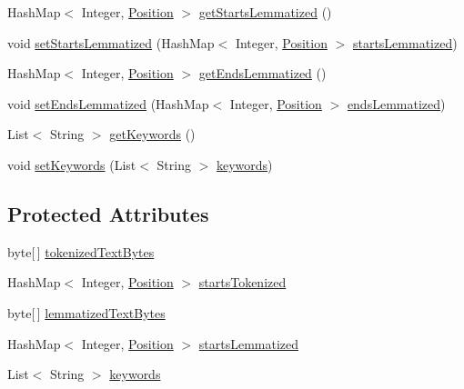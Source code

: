 \begin{DoxyCompactItemize}
\item 
Hash\+Map$<$ Integer, \hyperlink{classbr_1_1usp_1_1cata_1_1model_1_1_position}{Position} $>$ \hyperlink{classbr_1_1usp_1_1cata_1_1util_1_1_text_analyzer_language_a1e40bb475e2a0783236a3306ae2fc908}{get\+Starts\+Lemmatized} ()
\item 
void \hyperlink{classbr_1_1usp_1_1cata_1_1util_1_1_text_analyzer_language_af2cf60275059bfcea082e72e74bfffb6}{set\+Starts\+Lemmatized} (Hash\+Map$<$ Integer, \hyperlink{classbr_1_1usp_1_1cata_1_1model_1_1_position}{Position} $>$ \hyperlink{classbr_1_1usp_1_1cata_1_1util_1_1_text_analyzer_language_aff99f3709624a14b66386f13565c17c0}{starts\+Lemmatized})
\item 
Hash\+Map$<$ Integer, \hyperlink{classbr_1_1usp_1_1cata_1_1model_1_1_position}{Position} $>$ \hyperlink{classbr_1_1usp_1_1cata_1_1util_1_1_text_analyzer_language_a539448d1e72211b30c7d41db3037e6d6}{get\+Ends\+Lemmatized} ()
\item 
void \hyperlink{classbr_1_1usp_1_1cata_1_1util_1_1_text_analyzer_language_a1c021e7086708576a9a79eb8dcf0bc74}{set\+Ends\+Lemmatized} (Hash\+Map$<$ Integer, \hyperlink{classbr_1_1usp_1_1cata_1_1model_1_1_position}{Position} $>$ \hyperlink{classbr_1_1usp_1_1cata_1_1util_1_1_text_analyzer_language_ae4accddf4baccd7bd94f7182a06f7983}{ends\+Lemmatized})
\item 
List$<$ String $>$ \hyperlink{classbr_1_1usp_1_1cata_1_1util_1_1_text_analyzer_language_a671ff897c00c2497c5f2aa6a7bd74da9}{get\+Keywords} ()
\item 
void \hyperlink{classbr_1_1usp_1_1cata_1_1util_1_1_text_analyzer_language_a0427f03ba4d2debaee522765983595d4}{set\+Keywords} (List$<$ String $>$ \hyperlink{classbr_1_1usp_1_1cata_1_1util_1_1_text_analyzer_language_a83540b62896db6078feb0ec5d54d8d33}{keywords})
\end{DoxyCompactItemize}
\subsection*{Protected Attributes}
\begin{DoxyCompactItemize}
\item 
byte\mbox{[}$\,$\mbox{]} \hyperlink{classbr_1_1usp_1_1cata_1_1util_1_1_text_analyzer_language_a945cbd60b872e79913ef762b25071eb8}{tokenized\+Text\+Bytes}
\item 
Hash\+Map$<$ Integer, \hyperlink{classbr_1_1usp_1_1cata_1_1model_1_1_position}{Position} $>$ \hyperlink{classbr_1_1usp_1_1cata_1_1util_1_1_text_analyzer_language_ac18cfd71df27ee79aa0ed4af4f76d1ae}{starts\+Tokenized}
\item 
byte\mbox{[}$\,$\mbox{]} \hyperlink{classbr_1_1usp_1_1cata_1_1util_1_1_text_analyzer_language_a0dbe36375f70b73f9f6e2cb553a57e20}{lemmatized\+Text\+Bytes}
\item 
Hash\+Map$<$ Integer, \hyperlink{classbr_1_1usp_1_1cata_1_1model_1_1_position}{Position} $>$ \hyperlink{classbr_1_1usp_1_1cata_1_1util_1_1_text_analyzer_language_aff99f3709624a14b66386f13565c17c0}{starts\+Lemmatized}
\item 
List$<$ String $>$ \hyperlink{classbr_1_1usp_1_1cata_1_1util_1_1_text_analyzer_language_a83540b62896db6078feb0ec5d54d8d33}{keywords}
\end{DoxyCompactItemize}
